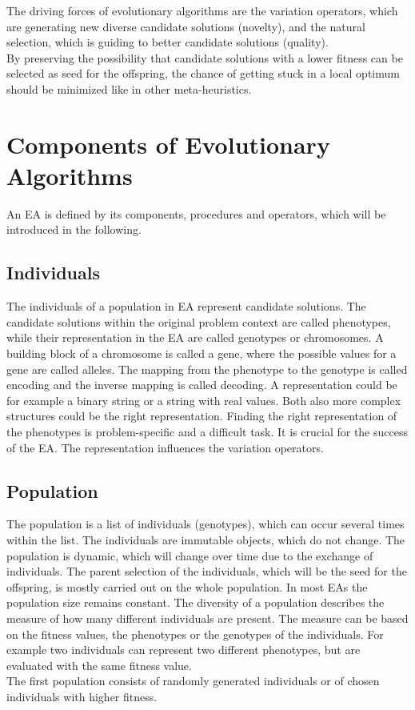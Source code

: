 The driving forces of evolutionary algorithms are the variation operators, which are generating new diverse candidate solutions (novelty), and the natural selection, which is guiding to better candidate solutions (quality)\cite{Eiben}.\\
By preserving the possibility that candidate solutions with a lower fitness can be selected as seed for the offspring, the chance of getting stuck in a local optimum should be minimized like in other meta-heuristics.

    \section{Components of Evolutionary Algorithms}
    \label{sec:EAcomponents}
    An EA is defined by its components, procedures and operators, which will be introduced in the following.
        
        \subsection{Individuals}
        The individuals of a population in EA represent candidate solutions. The candidate solutions within the original problem context are called phenotypes, while their representation in the EA are called genotypes or chromosomes. A building block of a chromosome is called a gene, where the possible values for a gene are called alleles. The mapping from the phenotype to the genotype is called encoding and the inverse mapping is called decoding. A representation could be for example a binary string or a string with real values. Both also more complex structures could be the right representation. Finding the right representation of the phenotypes is problem-specific and a difficult task. It is crucial for the success of the EA. The representation influences the variation operators.
        
        \subsection{Population}
        The population is a list of individuals (genotypes), which can occur several times within the list. The individuals are immutable objects, which do not change. The population is dynamic, which will change over time due to the exchange of individuals. The parent selection of the individuals, which will be the seed for the offspring, is mostly carried out on the whole population. In most EAs the population size remains constant. The diversity of a population describes the measure of how many different individuals are present. The measure can be based on the fitness values, the phenotypes or the genotypes of the individuals. For example two individuals can represent two different phenotypes, but are evaluated with the same fitness value.\\
        The first population consists of randomly generated individuals or of chosen individuals with higher fitness.
        
